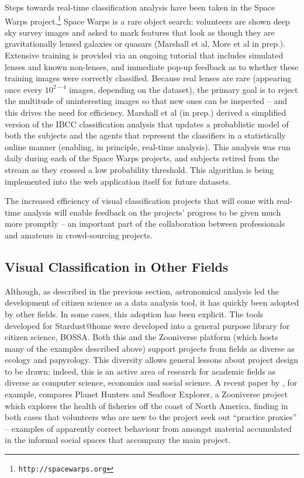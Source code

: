 \documentclass{ar2e}
\def\CaseStudy#1{\noindent{\it\bf #1 \,\,\,\,}}
\def\url#1{\texttt{#1}}
\begin{document}
\CaseStudy{Rare event detection: Space Warps} 
Steps towards real-time classification analysis have been taken in the Space
Warps project.\footnote{\url{http://spacewarps.org}} 
Space Warps is a rare object search: volunteers are shown deep
sky survey images and asked to mark features that look as though they are
gravitationally lensed galaxies or quasars (Marshall et al, More et al in prep.).
Extensive training is
provided via an ongoing tutorial that includes simulated lenses and known
non-lenses, and immediate pop-up feedback as to whether these training images
were correctly classified. Because real lenses are rare (appearing once every
$10^{2-4}$ images, depending on the dataset), the primary goal is to reject the
multitude of uninteresting images so that new ones can be inspected -- and this
drives the need for efficiency. Marshall et al (in prep.) derived a
simplified version of the IBCC classification analysis that updates a
probablistic model of both the subjects and the agents that represent the
classifiers in a statistically online manner (enabling, in principle, real-time
analysis). This
analysis was run daily during each of the Space Warps projects, and subjects
retired from the stream as they crossed a low probability threshold. This
algorithm is being implemented into the web application itself for future
datasets. 

The increased  efficiency of visual classification projects that will come with
real-time analysis will enable feedback on the projects' progress to be given
much more promptly -- an important part of the collaboration between
professionals and amateurs in crowd-sourcing projects.



\subsection{Visual Classification in Other Fields}
\label{sec:class:non-astro}

Although, as described in the previous section, astronomical analysis led the
development of citizen science as a data analysis tool, it has quickly been
adopted by other fields. In some cases, this adoption has been explicit. The
tools developed for Stardust@home were developed into a general purpose
library for citizen science, BOSSA. Both this and the Zooniverse platform
(which hosts many of the examples described above) support projects from
fields as diverse as ecology and papyrology. This diversity allows general
lessons about project design to be drawn; indeed, this is an active area of
research for academic fields as diverse as computer science, economics and
social science. A recent paper by \citet{Crowston}, for example, compares
Planet Hunters and Seafloor Explorer,  a Zooniverse project which explores the
health of fisheries off the coast of North America, finding in both cases that
volunteers who are new to the project seek out ``practice proxies'' --
examples of apparently correct behaviour from amongst material accumulated in
the informal social spaces that accompany the main project.
\end{document}
